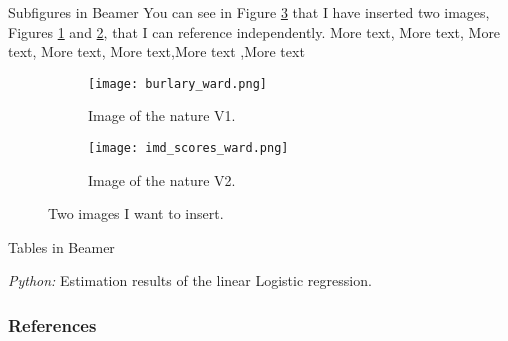 \documentclass[11pt, aspectratio=169]{beamer}
\begin{document}
\begin{frame}{Subfigures in Beamer}
    You can see in Figure \ref{fig:images} that I have inserted two images, Figures \ref{fig:nature1} and \ref{fig:nature2}, that I can reference independently. More text, More text, More text, More text, More text,More text ,More text 
    \begin{figure}
        \centering
            \begin{subfigure}[t]{0.4\textwidth}
                \texttt{[image: burlary\_ward.png]}
                \caption{Image of the nature V1.}\label{fig:nature1}
            \end{subfigure}
            \begin{subfigure}[t]{0.4\textwidth}
                \texttt{[image: imd\_scores\_ward.png]}
                \caption{Image of the nature V2.}\label{fig:nature2}
            \end{subfigure}
        \caption{Two images I want to insert.}\label{fig:images}
    \end{figure}
\end{frame}
                
\begin{frame}{Tables in Beamer}
    \small\begin{table}[!h]
        
        \caption{\label{tab:python-summary}\emph{Python:} Estimation results of the
            linear Logistic regression.}
    \end{table}
\end{frame}



\begin{frame}[allowframebreaks]
    \frametitle{References}
    \renewcommand{\bibfont}{\normalfont\footnotesize}
    \printbibliography
\end{frame}
\end{document}
